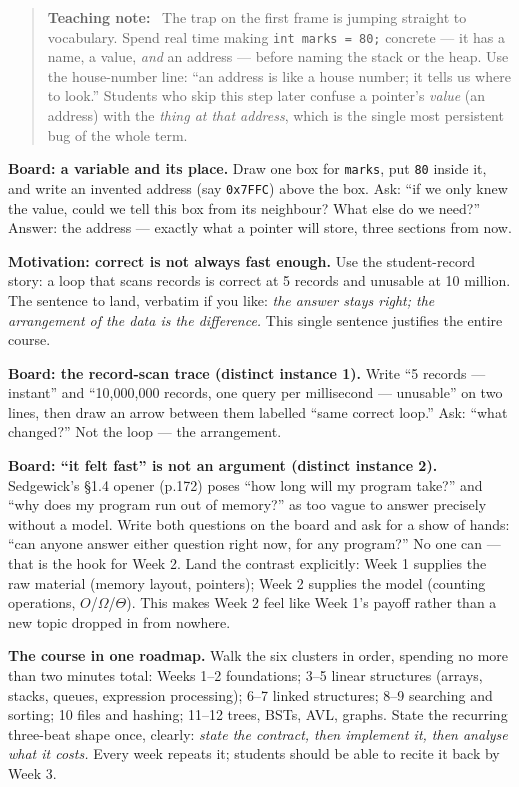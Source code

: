 \documentclass[11pt]{article}
\newenvironment{teachingaside}{\begin{quote}\small\color{primary-gold}\textbf{Teaching note:}\ }{\end{quote}}
\begin{document}
\begin{teachingaside}
The trap on the first frame is jumping straight to vocabulary. Spend real time making \texttt{int marks = 80;} concrete --- it has a name, a value, \emph{and} an address --- before naming the stack or the heap. Use the house-number line: ``an address is like a house number; it tells us where to look.'' Students who skip this step later confuse a pointer's \emph{value} (an address) with the \emph{thing at that address}, which is the single most persistent bug of the whole term.
\end{teachingaside}

\textbf{Board: a variable and its place.} Draw one box for \texttt{marks}, put \texttt{80} inside it, and write an invented address (say \texttt{0x7FFC}) above the box. Ask: ``if we only knew the value, could we tell this box from its neighbour? What else do we need?'' Answer: the address --- exactly what a pointer will store, three sections from now.

\textbf{Motivation: correct is not always fast enough.} Use the student-record story: a loop that scans records is correct at 5 records and unusable at 10 million. The sentence to land, verbatim if you like: \emph{the answer stays right; the arrangement of the data is the difference.} This single sentence justifies the entire course.

\textbf{Board: the record-scan trace (distinct instance 1).} Write ``5 records --- instant'' and ``10{,}000{,}000 records, one query per millisecond --- unusable'' on two lines, then draw an arrow between them labelled ``same correct loop.'' Ask: ``what changed?'' Not the loop --- the arrangement.

\textbf{Board: ``it felt fast'' is not an argument (distinct instance 2).} Sedgewick's \S1.4 opener (p.172) poses ``how long will my program take?'' and ``why does my program run out of memory?'' as too vague to answer precisely without a model. Write both questions on the board and ask for a show of hands: ``can anyone answer either question right now, for any program?'' No one can --- that is the hook for Week 2. Land the contrast explicitly: Week 1 supplies the raw material (memory layout, pointers); Week 2 supplies the model (counting operations, $O$/$\Omega$/$\Theta$). This makes Week 2 feel like Week 1's payoff rather than a new topic dropped in from nowhere.

\textbf{The course in one roadmap.} Walk the six clusters in order, spending no more than two minutes total: Weeks 1--2 foundations; 3--5 linear structures (arrays, stacks, queues, expression processing); 6--7 linked structures; 8--9 searching and sorting; 10 files and hashing; 11--12 trees, BSTs, AVL, graphs. State the recurring three-beat shape once, clearly: \emph{state the contract, then implement it, then analyse what it costs.} Every week repeats it; students should be able to recite it back by Week 3.
\end{document}
